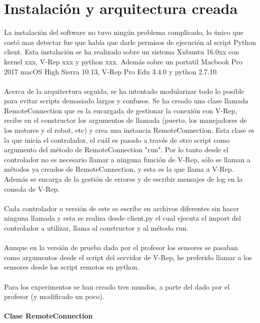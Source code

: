 \documentclass[14pt]{extarticle}
\theoremstyle{definition}
\theoremstyle{remark}
\begin{document}
\section{Instalación y arquitectura creada}\label{sec:instalacionyarquitecturacreada}
La instalación del software no tuvo ningún problema complicado, lo único que costó mas detectar fue que había que darle permisos de ejecución al script Python client. Esta instalación se ha realizado sobre un sistema Xubuntu 16.0xx con kernel xxx, V-Rep xxx y python xxx. Además sobre un portatil Macbook Pro 2017 macOS High Sierra 10.13, V-Rep  Pro Edu 3.4.0 y python 2.7.10.\\\\
Acerca de la arquitectura seguida, se ha intentado modularizar todo lo posible para evitar scripts demasiado largos y confusos. Se ha creado una clase llamada RemoteConnection que es la encargada de gestionar la conexión con V-Rep, recibe en el constructor los argumentos de llamada (puerto, los manejadores de los motores y el robot, etc) y crea una instancia RemoteConnection. Esta clase es la que inicia el controlador, el cuál es pasado a través de otro script como argumento del método de RemoteConnection "run". Por lo tanto desde el controlador no es necesario llamar a ninguna función de V-Rep, sólo se llaman a métodos ya creados de RemoteConnection, y esta es la que llama a V-Rep. Además se encarga de la gestión de errores y de escribir mensajes de log en la consola de V-Rep.\\\\
Cada controlador o versión de este se escribe en archivos diferentes sin hacer ninguna llamada y esta se realiza desde client.py el cual ejecuta el import del controlador a utilizar, llama al constructor y al método run.\\\\
Aunque en la versión de prueba dada por el profesor los sensores se pasaban como argumentos desde el script del servidor de V-Rep, he preferido llamar a los sensores desde los script remotos en python.\\\\
Para los experimentos se han creado tres mundos, a parte del dado por el profesor (y modificado un poco).\\\\
\newpage
\textbf{Clase RemoteConnection}\\\\
\end{document}
